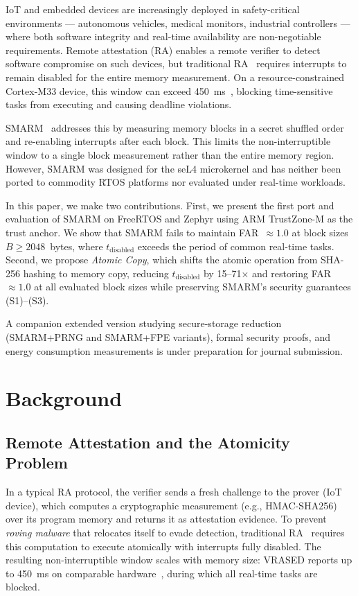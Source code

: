 \documentclass[conference]{IEEEtran}
\newcommand{\tdis}{$t_{\mathrm{disabled}}$\xspace}
\begin{document}
IoT and embedded devices are increasingly deployed in safety-critical
environments --- autonomous vehicles, medical monitors, industrial
controllers --- where both software integrity and real-time
availability are non-negotiable requirements. Remote attestation (RA)
enables a remote verifier to detect software compromise on such
devices, but traditional
RA~\cite{eldefrawy2012smart,nunes2019vrased,eldefrawy2017hydra}
requires interrupts to remain disabled for the entire memory
measurement. On a resource-constrained Cortex-M33 device, this window
can exceed 450~ms~\cite{nunes2019vrased}, blocking time-sensitive
tasks from executing and causing deadline violations.
 
SMARM~\cite{carpent2018smarm} addresses this by measuring memory
blocks in a secret shuffled order and re-enabling interrupts after
each block. This limits the non-interruptible window to a single block
measurement rather than the entire memory region. However, SMARM was
designed for the seL4 microkernel and has neither been ported to
commodity RTOS platforms nor evaluated under real-time workloads.
 
In this paper, we make two contributions. First, we present the first
port and evaluation of SMARM on FreeRTOS and Zephyr using ARM
TrustZone-M as the trust anchor. We show that SMARM fails to maintain
FAR~$\approx 1.0$ at block sizes $B \geq 2048$~bytes, where \tdis
exceeds the period of common real-time tasks. Second, we propose
\emph{Atomic Copy}, which shifts the atomic operation from SHA-256
hashing to memory copy, reducing \tdis by 15--71$\times$ and
restoring FAR~$\approx 1.0$ at all evaluated block sizes while
preserving SMARM's security guarantees (S1)--(S3).
 
A companion extended version studying secure-storage reduction
(SMARM+PRNG and SMARM+FPE variants), formal security proofs, and
energy consumption measurements is under preparation for journal
submission.

\section{Background}
\label{sec:background}
 
\subsection{Remote Attestation and the Atomicity Problem}
 
In a typical RA protocol, the verifier sends a fresh challenge to the
prover (IoT device), which computes a cryptographic measurement
(e.g., HMAC-SHA256) over its program memory and returns it as
attestation evidence. To prevent \emph{roving malware} that relocates
itself to evade detection, traditional
RA~\cite{eldefrawy2012smart,nunes2019vrased} requires this computation
to execute atomically with interrupts fully disabled. The resulting
non-interruptible window scales with memory size: VRASED reports up to
450~ms on comparable hardware~\cite{nunes2019vrased}, during which all
real-time tasks are blocked.
 
\end{document}
